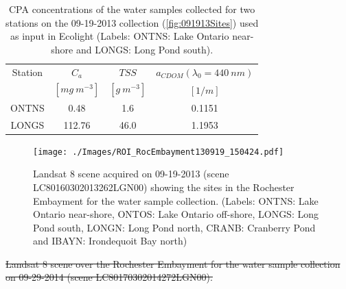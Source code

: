 \documentclass[onecolumn,3p,letterpaper,11pt]{elsarticle} %
\providecommand{\DIFdeltex}[1]{{\protect\color{red}\sout{#1}}}                      %
\providecommand{\DIFdelbegin}{} %
\providecommand{\DIFdelend}{} %
\providecommand{\DIFdelFL}[1]{\DIFdel{#1}} %
\providecommand{\DIFaddbeginFL}{} %
\providecommand{\DIFaddendFL}{} %
\providecommand{\DIFdelbeginFL}{} %
\providecommand{\DIFdelendFL}{} %
\providecommand{\DIFdel}[1]{\texorpdfstring{\DIFdeltex{#1}}{}} %
\begin{document}
\begin{table}[htbp!]
\caption{ CPA concentrations of the water samples collected for two stations on the 09-19-2013 collection (\autoref{fig:091913Sites}) used as input in Ecolight (Labels: ONTNS: Lake Ontario near-shore and LONGS: Long Pond south). \label{tab:ONTNSconc} } 
\small
\centering
\begin{tabular}{c|c|c|c} 
 Station & \bfseries{$C_a$} & \bfseries{$TSS$} & \DIFdelbeginFL %
\DIFdelendFL \DIFaddbeginFL \bfseries{$a_{CDOM}(\lambda_0=440~nm)$}\DIFaddendFL \\
 & $[mg~m^{-3}]$ & $[g~m^{-3}]$ & $[1/m]$ \\ \hline \hline
ONTNS & 0.48   & 1.6  & 0.1151 \\ 
LONGS & 112.76 & 46.0 & 1.1953 \\ 
 \end{tabular}
\end{table}

\begin{figure}[htb]
  \centering
  \DIFdelbeginFL %
\DIFdelendFL \DIFaddbeginFL \texttt{[image: ./Images/ROI\_RocEmbayment130919\_150424.pdf]}
  \DIFaddendFL \caption{Landsat 8 scene acquired on 09-19-2013 (scene LC80160302013262LGN00) showing the sites in the Rochester Embayment for the water sample collection. (Labels: ONTNS: Lake Ontario near-shore, ONTOS: Lake Ontario off-shore, LONGS: Long Pond south, LONGN: Long Pond north, CRANB: Cranberry Pond and IBAYN: Irondequoit Bay north)\label{fig:091913Sites} } 
\end{figure}

\DIFdelbegin %
{%
\DIFdelFL{Landsat 8 scene over the Rochester Embayment for the water sample collection on 09-29-2014 (scene LC80170302014272LGN00).}%
} 
\DIFdelend %
\end{document}
